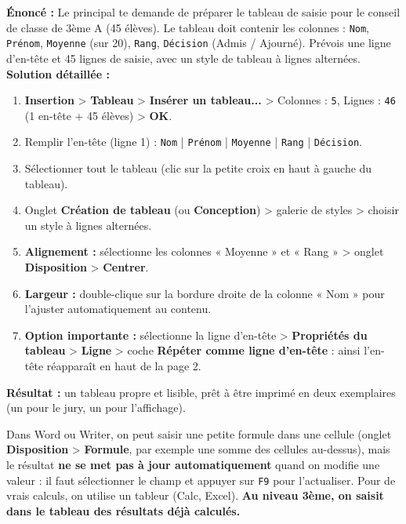 \documentclass[11pt]{article}
\begin{document}
\begin{exoresolu}
\textbf{Énoncé :} Le principal te demande de préparer le tableau de saisie pour le conseil de classe de 3ème A (45 élèves). Le tableau doit contenir les colonnes : \texttt{Nom}, \texttt{Prénom}, \texttt{Moyenne} (sur 20), \texttt{Rang}, \texttt{Décision} (Admis / Ajourné). Prévois une ligne d'en-tête et 45 lignes de saisie, avec un style de tableau à lignes alternées.
\tcblower
\textbf{Solution détaillée :}
\begin{enumerate}
    \item \textbf{Insertion} \textgreater{} \textbf{Tableau} \textgreater{} \textbf{Insérer un tableau...} \textgreater{} Colonnes : \texttt{5}, Lignes : \texttt{46} (1 en-tête + 45 élèves) \textgreater{} \textbf{OK}.
    \item Remplir l'en-tête (ligne 1) : \texttt{Nom} | \texttt{Prénom} | \texttt{Moyenne} | \texttt{Rang} | \texttt{Décision}.
    \item Sélectionner tout le tableau (clic sur la petite croix en haut à gauche du tableau).
    \item Onglet \textbf{Création de tableau} (ou \textbf{Conception}) \textgreater{} galerie de styles \textgreater{} choisir un style à lignes alternées.
    \item \textbf{Alignement :} sélectionne les colonnes « Moyenne » et « Rang » \textgreater{} onglet \textbf{Disposition} \textgreater{} \textbf{Centrer}.
    \item \textbf{Largeur :} double-clique sur la bordure droite de la colonne « Nom » pour l'ajuster automatiquement au contenu.
    \item \textbf{Option importante :} sélectionne la ligne d'en-tête \textgreater{} \textbf{Propriétés du tableau} \textgreater{} \textbf{Ligne} \textgreater{} coche \textbf{Répéter comme ligne d'en-tête} : ainsi l'en-tête réapparaît en haut de la page 2.
\end{enumerate}
\textbf{Résultat :} un tableau propre et lisible, prêt à être imprimé en deux exemplaires (un pour le jury, un pour l'affichage).
\end{exoresolu}

\begin{attention}
Dans Word ou Writer, on peut saisir une petite formule dans une cellule (onglet \textbf{Disposition} \textgreater{} \textbf{Formule}, par exemple une somme des cellules au-dessus), mais le résultat \textbf{ne se met pas à jour automatiquement} quand on modifie une valeur : il faut sélectionner le champ et appuyer sur \texttt{F9} pour l'actualiser. Pour de vrais calculs, on utilise un tableur (Calc, Excel). \textbf{Au niveau 3ème, on saisit dans le tableau des résultats déjà calculés.}
\end{attention}
\end{document}
